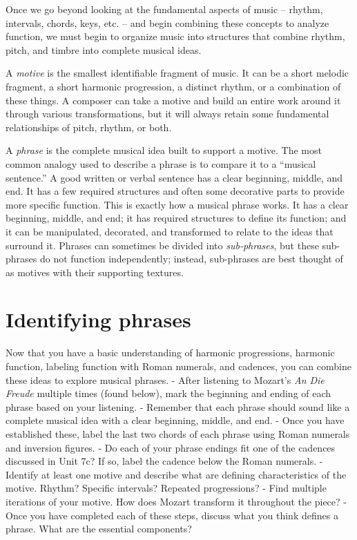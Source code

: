 \documentclass{book}
\begin{document}
Once we go beyond looking at the fundamental aspects of music -- rhythm,
intervals, chords, keys, etc. -- and begin combining these concepts to analyze
function, we must begin to organize music into structures that combine rhythm,
pitch, and timbre into complete musical ideas.

A \emph{motive} is the smallest identifiable fragment of music. It can be a
short melodic fragment, a short harmonic progression, a distinct rhythm, or a
combination of these things. A composer can take a motive and build an entire
work around it through various transformations, but it will always retain some
fundamental relationships of pitch, rhythm, or both.

A \emph{phrase} is the complete musical idea built to support a motive. The
most common analogy used to describe a phrase is to compare it to a ``musical
sentence.'' A good written or verbal sentence has a clear beginning, middle,
and end. It has a few required structures and often some decorative parts to
provide more specific function. This is exactly how a musical phrase works. It
has a clear beginning, middle, and end; it has required structures to define
its function; and it can be manipulated, decorated, and transformed to relate
to the ideas that surround it. Phrases can sometimes be divided into
\emph{sub-phrases}, but these sub-phrases do not function independently;
instead, sub-phrases are best thought of as motives with their supporting
textures.

\hypertarget{identifying-phrases}{%
\section{Identifying phrases}\label{identifying-phrases}}

Now that you have a basic understanding of harmonic progressions, harmonic
function, labeling function with Roman numerals, and cadences, you can combine
these ideas to explore musical phrases. - After listening to Mozart's \emph{An
Die Freude} multiple times (found below), mark the beginning and ending of
each phrase based on your listening. - Remember that each phrase should sound
like a complete musical idea with a clear beginning, middle, and end. - Once
you have established these, label the last two chords of each phrase using
Roman numerals and inversion figures. - Do each of your phrase endings fit one
of the cadences discussed in Unit 7c? If so, label the cadence below the Roman
numerals. - Identify at least one motive and describe what are defining
characteristics of the motive. Rhythm? Specific intervals? Repeated
progressions? - Find multiple iterations of your motive. How does Mozart
transform it throughout the piece? - Once you have completed each of these
steps, discuss what you think defines a phrase. What are the essential
components?
\end{document}
